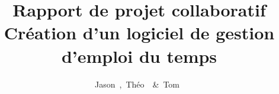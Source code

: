 \newcommand{\HRule}{\rule{\linewidth}{0.5mm}} %
\newcommand*{\theuniversity}{Université de Toulon}
\newcommand*{\theyearname}{Master d'informatique, développement et ingénierie des données (\bsc{did}),
1\textsuperscript{re}~année}
\newcommand*{\thesupervisor}{Laurent~\bsc{Loiseau}~\&~Jérémy~\bsc{Mallofre}}
\author{Jason~,~Théo~~\&~Tom~}
\title{Rapport de projet collaboratif \\
Création d'un logiciel de gestion d'emploi du temps}
\setheadfoot{\headheight}{\footskip}
\checkandfixthelayout[nearest]
\renewcommand*{\sideparfont}{\itshape\footnotesize}
\renewcommand*{\sideparform}{\ifmemtortm\RaggedRight\else\RaggedLeft\fi%
  \mathsurround=1pt%
  \parindent=0pt%
}
\setlength\epigraphwidth{\linewidth}
\setlength\epigraphrule{0pt}
\AtBeginDocument{\renewcommand{\epigraphflush}{center}}
\renewcommand {\sourceflush}{center}%
\newcommand{\headepigraph}[2]{\epigraph{\centering #1}{\bfseries---\enspace\bsc{#2}}}
\renewcommand{\cftpartaftersnum}{.}
\renewcommand\cftchapteraftersnum{.\space} 
\renewcommand\cftsectionaftersnum{.\space}
\renewcommand\cftsubsectionaftersnum{.\space}
\renewcommand\cftsubsubsectionaftersnum{.\space} 
\renewcommand\cfttableaftersnum{.\space}  
\renewcommand\cftfigureaftersnum{.\space}  


\renewcommand{\cftpartdotsep}{\cftdotsep}
\renewcommand\cftpartpresnum{Partie~}
\addto\captionsfrench{\renewcommand{\appendixpagename}{Annexes}}
\addto\captionsfrench{\renewcommand{\appendixtocname}{Annexes}}
\renewcommand\partnamefont{\normalfont\huge\scshape}
\setmainfont[Ligatures={Common, Discretionary,TeX}]{TeX Gyre Pagella}

